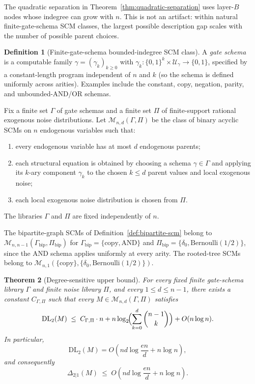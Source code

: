 \documentclass{article}
\theoremstyle{plain}
\newtheorem{theorem}{Theorem}[section]
\theoremstyle{definition}
\newtheorem{definition}[theorem]{Definition}
\newcommand{\calM}{\mathcal{M}}
\newcommand{\DL}{\mathrm{DL}}
\begin{document}
The quadratic separation in Theorem~\ref{thm:quadratic-separation} uses layer-$B$ nodes whose indegree can grow with $n$. This is not an artifact: within natural finite-gate-schema SCM classes, the largest possible description gap scales with the number of possible parent choices.

\begin{definition}[Finite-gate-schema bounded-indegree SCM class]
\label{def:finite-gate-class}
A \emph{gate schema} is a computable family $\gamma = (\gamma_k)_{k \geq 0}$ with $\gamma_k : \{0,1\}^k \times \mathcal{U}_\gamma \to \{0,1\}$, specified by a constant-length program independent of $n$ and $k$ (so the schema is defined uniformly across arities). Examples include the constant, copy, negation, parity, and unbounded-AND/OR schemas.

Fix a finite set $\Gamma$ of gate schemas and a finite set $\Pi$ of finite-support rational exogenous noise distributions. Let $\calM_{n,d}(\Gamma, \Pi)$ be the class of binary acyclic SCMs on $n$ endogenous variables such that:
\begin{enumerate}
    \item every endogenous variable has at most $d$ endogenous parents;
    \item each structural equation is obtained by choosing a schema $\gamma \in \Gamma$ and applying its $k$-ary component $\gamma_k$ to the chosen $k \leq d$ parent values and local exogenous noise;
    \item each local exogenous noise distribution is chosen from $\Pi$.
\end{enumerate}
The libraries $\Gamma$ and $\Pi$ are fixed independently of $n$.
\end{definition}

The bipartite-graph SCMs of Definition~\ref{def:bipartite-scm} belong to $\calM_{n,n-1}(\Gamma_{\mathrm{bip}}, \Pi_{\mathrm{bip}})$ for $\Gamma_{\mathrm{bip}} = \{\mathrm{copy}, \mathrm{AND}\}$ and $\Pi_{\mathrm{bip}} = \{\delta_0, \mathrm{Bernoulli}(1/2)\}$, since the AND schema applies uniformly at every arity. The rooted-tree SCMs belong to $\calM_{n,1}(\{\mathrm{copy}\}, \{\delta_0, \mathrm{Bernoulli}(1/2)\})$.

\begin{theorem}[Degree-sensitive upper bound]
\label{thm:degree-upper}
For every fixed finite gate-schema library $\Gamma$ and finite noise library $\Pi$, and every $1 \leq d \leq n-1$, there exists a constant $C_{\Gamma,\Pi}$ such that every $M \in \calM_{n,d}(\Gamma,\Pi)$ satisfies
\[
    \DL_2(M) \;\leq\; C_{\Gamma,\Pi} \cdot n + n \log_2\!\Bigl(\sum_{k=0}^{d} \binom{n-1}{k}\Bigr) + O(n \log n).
\]
In particular,
\[
    \DL_2(M) = O\!\left( n d \log\frac{en}{d} + n \log n \right),
\]
and consequently
\[
    \Delta_{2|1}(M) \;\leq\; O\!\left( n d \log\frac{en}{d} + n \log n \right).
\]
\end{theorem}
\end{document}
